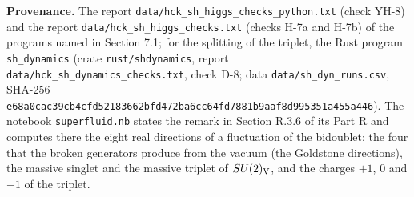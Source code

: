 \documentclass[
  10pt,
]{article}
\begin{document}
\textbf{Provenance.} The report
\texttt{data/hck\_sh\_higgs\_checks\_python.txt} (check YH-8) and the
report \texttt{data/hck\_sh\_higgs\_checks.txt} (checks H-7a and H-7b)
of the programs named in Section 7.1; for the splitting of the triplet,
the Rust program \texttt{sh\_dynamics} (crate \texttt{rust/shdynamics},
report \texttt{data/hck\_sh\_dynamics\_checks.txt}, check D-8; data
\texttt{data/sh\_dyn\_runs.csv}, SHA-256
\texttt{e68a0cac39cb4cfd52183662bfd472ba6cc64fd7881b9aaf8d995351a455a446}).
The notebook \texttt{superfluid.nb} states the remark in Section R.3.6
of its Part R and computes there the eight real directions of a
fluctuation of the bidoublet: the four that the broken generators
produce from the vacuum (the Goldstone directions), the massive singlet
and the massive triplet of \(SU(2)_{\rm V}\), and the charges \(+1\), 0
and \(-1\) of the triplet.
\end{document}
